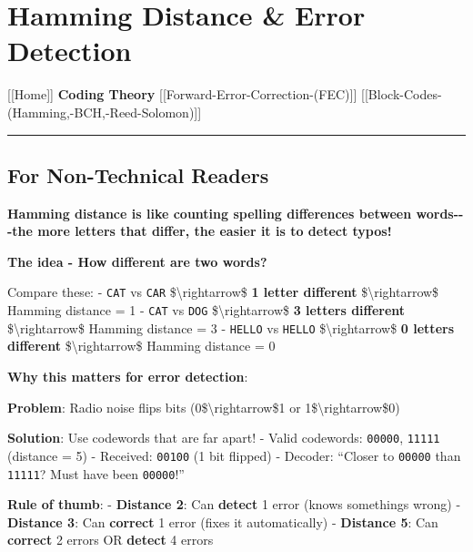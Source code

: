 \section{Hamming Distance \& Error
Detection}\label{hamming-distance-error-detection}

{[}{[}Home{]}{]} \textbar{} \textbf{Coding Theory} \textbar{}
{[}{[}Forward-Error-Correction-(FEC){]}{]} \textbar{}
{[}{[}Block-Codes-(Hamming,-BCH,-Reed-Solomon){]}{]}

\begin{center}\rule{0.5\linewidth}{0.5pt}\end{center}

\subsection{\texorpdfstring{ For Non-Technical
Readers}{ For Non-Technical Readers}}\label{for-non-technical-readers}

\textbf{Hamming distance is like counting spelling differences between
words-\/-\/-the more letters that differ, the easier it is to detect
typos!}

\textbf{The idea - How different are two words?}

Compare these: - \texttt{CAT} vs \texttt{CAR}
\$\textbackslash rightarrow\$ \textbf{1 letter different}
\$\textbackslash rightarrow\$ Hamming distance = 1 - \texttt{CAT} vs
\texttt{DOG} \$\textbackslash rightarrow\$ \textbf{3 letters different}
\$\textbackslash rightarrow\$ Hamming distance = 3 - \texttt{HELLO} vs
\texttt{HELLO} \$\textbackslash rightarrow\$ \textbf{0 letters
different} \$\textbackslash rightarrow\$ Hamming distance = 0

\textbf{Why this matters for error detection}:

\textbf{Problem}: Radio noise flips bits
(0\$\textbackslash rightarrow\$1 or 1\$\textbackslash rightarrow\$0)

\textbf{Solution}: Use codewords that are far apart! - Valid codewords:
\texttt{00000}, \texttt{11111} (distance = 5) - Received: \texttt{00100}
(1 bit flipped) - Decoder: ``Closer to \texttt{00000} than
\texttt{11111}? Must have been \texttt{00000}!''

\textbf{Rule of thumb}: - \textbf{Distance 2}: Can \textbf{detect} 1
error (knows something\textquotesingle s wrong) - \textbf{Distance 3}:
Can \textbf{correct} 1 error (fixes it automatically) - \textbf{Distance
5}: Can \textbf{correct} 2 errors OR \textbf{detect} 4 errors


